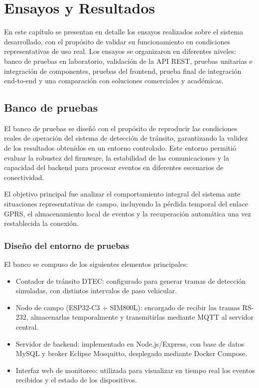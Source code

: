 
\chapter{Ensayos y Resultados} %
\label{sec:ensayos-resultados}
En este capítulo se presentan en detalle los ensayos realizados sobre el sistema desarrollado, con el propósito de validar su funcionamiento en condiciones representativas de uso real. 
Los ensayos se organizaron en diferentes niveles: banco de pruebas en laboratorio, validación de la API REST, pruebas unitarias e integración de componentes, 
pruebas del frontend, prueba final de integración end-to-end y una comparación con soluciones comerciales y académicas.  


\section{Banco de pruebas}
\label{sec:banco-pruebas}

El banco de pruebas se diseñó con el propósito de reproducir las condiciones reales de operación del sistema de detección de tránsito, garantizando la validez de los resultados obtenidos en un entorno controlado. Este entorno permitió evaluar la robustez del firmware, la estabilidad de las comunicaciones y la capacidad del backend para procesar eventos en diferentes escenarios de conectividad.

El objetivo principal fue analizar el comportamiento integral del sistema ante situaciones representativas de campo, incluyendo la pérdida temporal del enlace GPRS, el almacenamiento local de eventos y la recuperación automática una vez restablecida la conexión.

\subsection{Diseño del entorno de pruebas}

El banco se compuso de los siguientes elementos principales:

\begin{itemize}
    \item Contador de tránsito DTEC: configurado para generar tramas de detección simuladas, con distintos intervalos de paso vehicular.
    \item Nodo de campo (ESP32-C3 + SIM800L): encargado de recibir las tramas RS-232, almacenarlas temporalmente y transmitirlas mediante MQTT al servidor central.
    \item Servidor de backend: implementado en Node.js/Express, con base de datos MySQL y broker Eclipse Mosquitto, desplegado mediante Docker Compose.
    \item Interfaz web de monitoreo: utilizada para visualizar en tiempo real los eventos recibidos y el estado de los dispositivos.
\end{itemize}

